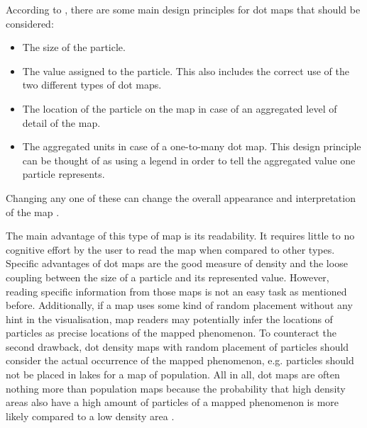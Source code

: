 According to \citeauthor{Tyner2010}, there are some main design principles for dot maps that should be considered:
\begin{itemize}
\item The size of the particle.
\item The value assigned to the particle. This also includes the correct use of the two different types of dot maps.
\item The location of the particle on the map in case of an aggregated level of detail of the map.
\item The aggregated units in case of a one-to-many dot map. This design principle can be thought of as using a legend in order to tell the aggregated value one particle represents.
\end{itemize}
Changing any one of these can change the overall appearance and interpretation of the map .

\cbstart
The main advantage of this type of map is its readability. It requires little to no cognitive effort by the user to read the map when compared to other types. Specific advantages of dot maps are the good measure of density and the loose coupling between the size of a particle and its represented value.
However, reading specific information from those maps is not an easy task as mentioned before. Additionally, if a map uses some kind of random placement without any hint in the visualisation, map readers may potentially infer the locations of particles as precise locations of the mapped phenomenon. To counteract the second drawback, dot density maps with random placement of particles should consider the actual occurrence of the mapped phenomenon, e.g. particles should not be placed in lakes for a map of population.
All in all, dot maps are often nothing more than population maps because the probability that high density areas also have a high amount of particles of a mapped phenomenon is more likely compared to a low density area .
\cbend